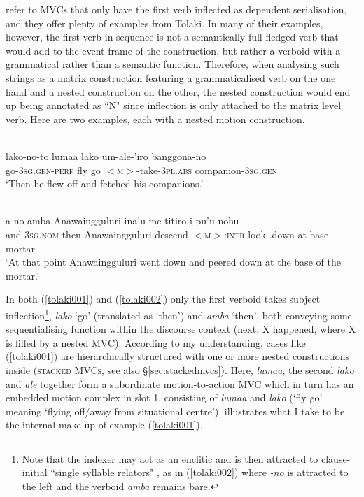 \citet{mead2008verb} refer to MVCs that only have the first verb inflected as dependent serialisation, and they offer plenty of examples from Tolaki. In many of their examples, however, the first verb in sequence is not a semantically full-fledged verb that would add to the event frame of the construction, but rather a verboid with a grammatical rather than a semantic function. Therefore, when analysing such strings as a matrix construction featuring a grammaticalised verb on the one hand and a nested construction on the other, the nested construction would end up being annotated as ``N" since inflection is only attached to the matrix level verb. Here are two examples, each with a nested motion construction.

\ea \label{tolaki001}
\\
\gll lako-no-to lumaa lako um-ale-'iro banggona-no \\
go-3\textsc{sg}.\textsc{gen}-\textsc{perf} fly go $<$\textsc{m}$>$-take-3\textsc{pl}.\textsc{abs} companion-3\textsc{sg}.\textsc{gen} \\
\glft `Then he flew off and fetched his companions.' \\ 
\z

\ea \label{tolaki002}
\\
\gll a-no amba Anawaingguluri ina'u me-titiro i pu'u nohu \\
and-3\textsc{sg}.\textsc{nom} then Anawaingguluri descend $<$\textsc{m}$>$:\textsc{intr}-look-.down at base mortar \\
\glft `At that point Anawaingguluri went down and peered down at the base of the mortar.'\\ 
\z

In both (\ref{tolaki001}) and (\ref{tolaki002}) only the first verboid takes subject inflection\footnote{Note that the indexer may act as an enclitic and is then attracted to clause-initial ``single syllable relators" \citep[114]{mead2008verb}, as in (\ref{tolaki002}) where \textit{-no} is attracted to the left and the verboid \textit{amba} remains bare.}, \textit{lako} `go' (translated as `then') and \textit{amba} `then', both conveying some sequentialising function within the discourse context (next, X happened, where X is filled by a nested MVC). According to my understanding, cases like (\ref{tolaki001}) are hierarchically structured with one or more nested constructions inside (\textsc{stacked MVCs}, see also §\ref{sec:stackedmvcs}). Here, \textit{lumaa}, the second \textit{lako} and \textit{ale} together form a subordinate motion-to-action MVC which in turn has an embedded motion complex in slot 1, consisting of \textit{lumaa} and \textit{lako} (`fly go' meaning `flying off/away from situational centre').  illustrates what I take to be the internal make-up of example (\ref{tolaki001}).

